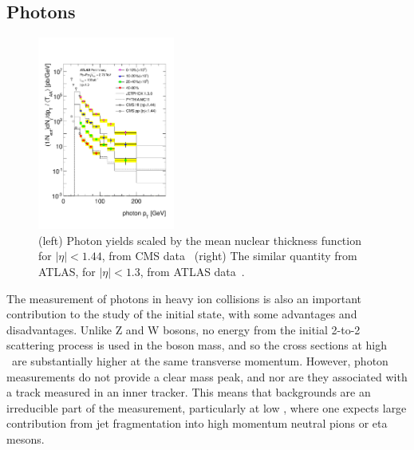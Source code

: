 \subsection{Photons}

\begin{figure}[!htb]
\begin{center}
\includegraphics[width=0.40\textwidth]{electroweak_figs/ph_fig_11.pdf}
\caption[]{(left) Photon yields scaled by the mean nuclear thickness function for $|\eta|<1.44$, from CMS data~\cite{Chatrchyan:2012vq} (right) The similar quantity from ATLAS, for $|\eta|<1.3$, from ATLAS data~\cite{ATLAS:2012zla}.}
\label{fig:pas:photon}
\end{center}
\end{figure}

The measurement of photons in heavy ion collisions is also an important contribution to the
study of the \PbPb initial state, with some advantages and disadvantages.  Unlike Z and W bosons,
no energy from the initial 2-to-2 scattering process is used in the boson mass,
and so the cross sections at high \pT\ are substantially higher at the same transverse momentum.
However, photon measurements do not provide a clear mass peak, and nor are they associated with
a track measured in an inner tracker.  This means that backgrounds are an irreducible part of
the measurement, particularly at low \pT, where one expects large contribution from jet fragmentation
into high momentum neutral pions or eta mesons.


